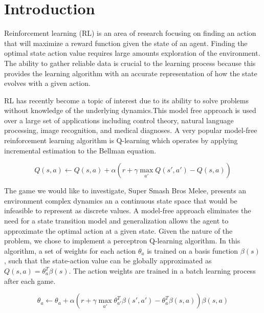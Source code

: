 
\section{Introduction}

Reinforcement learning (RL) is an area of research focusing on finding an action that will maximize a reward function given the state of an agent. Finding the optimal state action value requires large amounts exploration of the environment. The ability to gather reliable data is crucial to the learning process because this provides the learning algorithm with an accurate representation of how the state evolves with a given action. 

RL has recently become a topic of interest due to its ability to solve problems without knowledge of the underlying dynamics.This model free approach is used over a large set of applications including control theory, natural language processing, image recognition, and medical diagnoses. A very popular model-free reinforcement learning algorithm is Q-learning which operates by applying incremental estimation to the Bellman equation\cite{DMU}.

\vspace{-6mm}
\begin{equation}
	Q(s,a) \leftarrow Q(s,a)+\alpha(r + \gamma \max_{a'} Q(s',a') - Q(s,a))
\end{equation}
\vspace{-8mm}

The game we would like to investigate, Super Smash Bros Melee, presents an environment complex dynamics an a continuous state space that would be infeasible to represent as discrete values. A model-free approach eliminates the need for a state transition model and generalization allows the agent to approximate the optimal action at a given state. Given the nature of the problem, we chose to implement a perceptron Q-learning algorithm. In this algorithm, a set of weights for each action $\theta_a$ is trained on a basis function $\beta(s)$, such that the state-action value can be globally approximated as $Q(s,a) = \theta^T_a\beta(s)$. The action weights are trained in a batch learning process after each game.

\vspace{-6mm}
\begin{equation}
	\theta_a \leftarrow \theta_a+\alpha(r + \gamma \max_{a'} \theta_{a'}^T\beta(s',a') -  \theta_{a}^T\beta(s,a))\beta(s,a)
\end{equation}
\vspace{-8mm}

